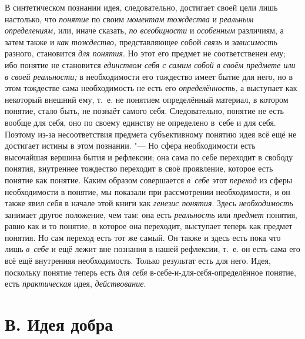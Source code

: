 В синтетическом познании идея, следовательно, достигает своей
цели лишь настолько, что {\em понятие}
по своим {\em моментам
тождества} и
{\em реальным определениям,}
или, иначе сказать,
{\em по всеобщности} и
{\em особенным}
различиям, а затем также и
{\em как тождество,}
представляющее собой
{\em связь} и
{\em зависимость}
разного, становится
{\em для понятия}. Но
этот его предмет не соответственен ему; ибо понятие не становится
{\em единством себя с самим собой в
своём предмете или в своей реальности;} в необходимости его
тождество имеет бытие для него, но в этом тождестве сама необходимость не
есть его {\em определённость,}
а выступает как некоторый внешний ему, т.~е. не понятием
определённый материал, в котором понятие, стало быть, не познаёт самого
себя. Следовательно, понятие не есть вообще для себя, оно по своему
единству не определено в~себе и для себя. Поэтому из-за несоответствия
предмета субъективному понятию идея всё ещё не достигает
истины в этом познании. "--- Но сфера необходимости есть
высочайшая вершина бытия и рефлексии; она сама по себе переходит в свободу
понятия, внутреннее тождество переходит в своё проявление, которое есть
понятие как понятие. Каким образом совершается
{\em в~себе} этот
{\em переход} из сферы
необходимости в понятие, мы показали при рассмотрении необходимости, и он
также явил себя в начале этой книги как
{\em генезис понятия}.
Здесь {\em необходимость}
занимает другое положение, чем там: она есть
{\em реальность} или
{\em предмет} понятия,
равно как и то понятие, в которое она переходит, выступает теперь как
предмет понятия. Но сам переход есть тот же самый. Он также и здесь есть
пока что лишь {\em в~себе}
и ещё лежит вне познания в нашей рефлексии, т.~е. он есть
сама его всё ещё внутренняя необходимость. Только результат есть для него.
Идея, поскольку понятие теперь есть
{\em для себя}
в-себе-и-для-себя-определённое понятие, есть
{\em практическая} идея,
{\em действование}.

\section[В. Идея добра]{В. Идея добра}


